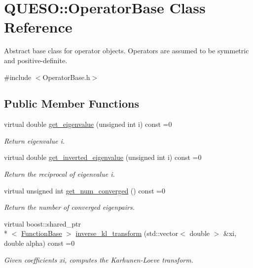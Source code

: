 \hypertarget{class_q_u_e_s_o_1_1_operator_base}{\section{Q\-U\-E\-S\-O\-:\-:Operator\-Base Class Reference}
\label{class_q_u_e_s_o_1_1_operator_base}
}


Abstract base class for operator objects. Operators are assumed to be symmetric and positive-\/definite.  




{\ttfamily \#include $<$Operator\-Base.\-h$>$}

\subsection*{Public Member Functions}
\begin{DoxyCompactItemize}
\item 
virtual double \hyperlink{class_q_u_e_s_o_1_1_operator_base_ae16245b5e46e01ff81121cca14190e7f}{get\-\_\-eigenvalue} (unsigned int i) const =0
\begin{DoxyCompactList}\small\item\em Return eigenvalue {\ttfamily i}. \end{DoxyCompactList}\item 
virtual double \hyperlink{class_q_u_e_s_o_1_1_operator_base_a598da528247dcaec786eee415664d42e}{get\-\_\-inverted\-\_\-eigenvalue} (unsigned int i) const =0
\begin{DoxyCompactList}\small\item\em Return the reciprocal of eigenvalue {\ttfamily i}. \end{DoxyCompactList}\item 
virtual unsigned int \hyperlink{class_q_u_e_s_o_1_1_operator_base_a610fc538c34726a001d49c138a17817e}{get\-\_\-num\-\_\-converged} () const =0
\begin{DoxyCompactList}\small\item\em Return the number of converged eigenpairs. \end{DoxyCompactList}\item 
virtual boost\-::shared\-\_\-ptr\\*
$<$ \hyperlink{class_q_u_e_s_o_1_1_function_base}{Function\-Base} $>$ \hyperlink{class_q_u_e_s_o_1_1_operator_base_adb765561b8de30f081fe23c53b1a03fb}{inverse\-\_\-kl\-\_\-transform} (std\-::vector$<$ double $>$ \&xi, double alpha) const =0
\begin{DoxyCompactList}\small\item\em Given coefficients {\ttfamily xi}, computes the Karhunen-\/\-Loeve transform. \end{DoxyCompactList}\end{DoxyCompactItemize}
